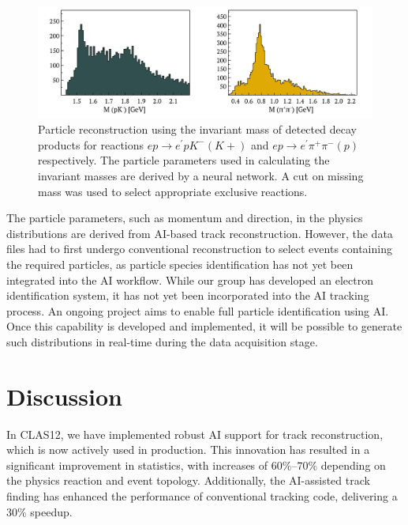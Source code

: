 \documentclass{webofc}
\begin{document}
\begin{figure}[h!]
\centering
\includegraphics[width=0.85\columnwidth]{images/figure_lambda_instarec.pdf}
\caption{Particle reconstruction using the invariant mass of detected decay products for reactions $ep\rightarrow e^\prime p K^- (K+)$ and $ep\rightarrow e^\prime\pi^+\pi^-(p)$ respectively. The particle parameters used in calculating the invariant masses are derived by a neural network. A cut on missing mass was used to select appropriate exclusive reactions.} 
\label{fig:ai_instarec}
\end{figure}

The particle parameters, such as momentum and direction, in the physics distributions are derived from AI-based track reconstruction. However, the data files had to first undergo conventional reconstruction to select events containing the required particles, as particle species identification has not yet been integrated into the AI workflow. While our group has developed an electron identification system, it has not yet been incorporated into the AI tracking process. An ongoing project aims to enable full particle identification using AI. Once this capability is developed and implemented, it will be possible to generate such distributions in real-time during the data acquisition stage.


\section{Discussion}
In CLAS12, we have implemented robust AI support for track reconstruction, which is now actively used in production. This innovation has resulted in a significant improvement in statistics, with increases of $60\%–70\%$ depending on the physics reaction and event topology. Additionally, the AI-assisted track finding has enhanced the performance of conventional tracking code, delivering a $30\%$ speedup.
\end{document}
